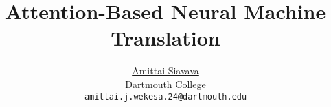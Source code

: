 
\usepackage{arxiv}
\usepackage{amsmath, amsfonts, amsthm, amssymb, amscd, amsxtra}
\usepackage[utf8]{inputenc} %
\usepackage[T1]{fontenc}    %
\usepackage{hyperref}       %
\usepackage{url}            %
\usepackage{booktabs}       %
\usepackage{amsfonts}       %
\usepackage{nicefrac}       %
\usepackage{microtype}      %
\usepackage{cleveref}       %
\usepackage{lipsum}         %
\usepackage{graphicx}
\usepackage{doi}
\usepackage[backend=bibtex,style=numeric]{biblatex}
\usepackage{pgfplots}
\pgfplotsset{compat=1.18}

\usepackage{subcaption}
\usepackage{array, multirow}

\usepackage{float}

\usepackage{enumitem}

\newenvironment{enumalph}{
  \begin{enumerate}[label=(\alph*)]
}{\end{enumerate}}

\newenvironment{enumroman}{
  \begin{enumerate}[label=(\roman*)]
}{\end{enumerate}}

\newenvironment{enumarabic}{
  \begin{enumerate}[label=\textbf{\arabic*.}]
}{\end{enumerate}}

\newenvironment{enumarabic*}{
  \begin{enumerate}[label*=\textbf{\arabic*.}]
}{\end{enumerate}}


\title{Attention-Based Neural Machine Translation}
\author{
	\href{https://amittai.studio}{Amittai Siavava} \\
		Dartmouth College \\
		\texttt{amittai.j.wekesa.24@dartmouth.edu}
}

\renewcommand{\headeright}{Assignment Report}
\renewcommand{\undertitle}{Assignment Report}
\renewcommand{\shorttitle}{}



